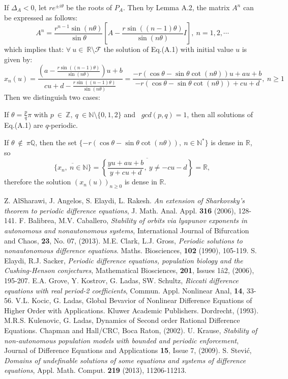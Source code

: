 \documentclass[11pt]{amsart}
\theoremstyle{definition}
\theoremstyle{remark}
\theoremstyle{example}
\numberwithin{equation}{section}
\begin{document}
\begin{description}[leftmargin=*]
\noindent
If $\Delta_A<0$, let $re^{\pm i\theta}$ be the roots of $P_A$. Then by Lemma A.2, the matrix $A^n$
can be expressed as follows:
$$A^{n}=\frac{r^{n-1}\sin(n\theta)}{\sin\theta}\left[A-\frac{r\sin((n-1)\theta)}{\sin (n\theta)}I\right], \ n=1, 2,\cdots$$
which implies that: $\forall \ u \in \ \mathbb{R}\setminus\mathcal{F}$ the solution of Eq.(A.1) with initial value $u$
is given by:
 $$x_{n}(u)=\frac{\left(a-\frac{r\sin((n-1)\theta)}{\sin(n\theta)}\right)u+b}{cu+d-
 \frac{r\sin((n-1)\theta)}{\sin(n\theta)}}=\frac{-r(\cos \theta-\sin \theta\cot(n\theta))u+au+b}{-r(\cos \theta-\sin
 \theta\cot(n\theta))+cu+d}, \ n\geq1$$
\noindent
Then we distinguish two cases:
\\
\noindent
\item[(2)-(iii)] If $\theta=\frac{p}{q}\pi$ with $p \ \in \ \mathbb{Z}, \ q \ \in \mathbb{N}\setminus\{0,1,2\}$ and \ $gcd(p,q)=1$, then all solutions of Eq.(A.1) are $q$-periodic.
\item[(2)-(iv)] If $\theta \ \not\in \ \pi\mathbb{Q}$, then the set
$\{-r(\cos \theta-\sin \theta\cot(n\theta)), \ n\in \mathbb{N}^{*}\}$ is dense in $\mathbb{R}$, so
    $$\overline{\{x_n, \ n \in \mathbb{N}\}}=\overline{\left\{\frac{yu+au+b}{y+cu+d}, \ y\neq-cu-d\right\}}=\mathbb{R},$$
    therefore the solution $(x_n(u))_{n\geq0}$ is dense in $\mathbb{R}$.\\
   \flushright{$\square$}
\end{description}

\medskip

\begin{thebibliography}{9}
Z. AlSharawi, J. Angelos, S. Elaydi, L. Rakesh.
\textit{An extension of Sharkovsky's theorem to periodic difference equations}, J. Math. Anal. Appl. \textbf{316} (2006), 128-141.
F. Balibrea, M.V. Caballero, \textit{Stability of orbits via lyapunov exponents in autonomous and nonautonomous systems}, International Journal of Bifurcation and Chaos, \textbf{23}, No. 07, (2013).
 M.E. Clark, L.J. Gross, \textit{Periodic solutions to nonautonomous difference equations}. Maths. Biosciences, \textbf{102} (1990), 105-119.
 S. Elaydi, R.J. Sacker, \textit{Periodic difference equations, population biology and the Cushing-Henson conjectures}, Mathematical Biosciences,
\textbf{201}, Issues 1â2, (2006), 195-207.
 E.A. Grove, Y. Kostrov, G. Ladas, SW. Schultz, \textit{Riccati difference equations with real period-2 coefficients},
Commun. Appl. Nonlinear Anal, \textbf{14}, 33-56.
 V.L. Kocic, G. Ladas, Global Bevavior of Nonlinear Difference Equations of Higher Order with Applications. Kluwer Academic Publishers. Dordrecht, (1993).
 M.R.S. Kulenovic, G. Ladas, Dynamics of Second order Rational Difference Equations. Chapman and Hall/CRC, Boca Raton, (2002).
 U. Krause, \textit{Stability of non-autonomous population models with bounded and periodic enforcement}, Journal of Difference Equations and Applications
\textbf{15}, Issue 7, (2009).
 S. Stevi\'c, \textit{Domains of undefinable solutions of some equations and systems of difference equations}, Appl. Math. Comput. \textbf{219} (2013), 11206-11213.
\end{thebibliography}
\end{document}
